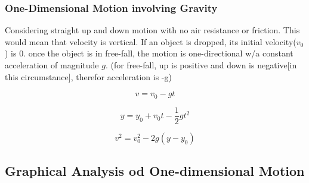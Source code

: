 \documentclass{article}
\begin{document}
\subsubsection{One-Dimensional Motion involving Gravity}
Considering straight up and down motion with no air resistance or friction. This would mean that velocity is vertical. If an object is dropped, its initial velocity($v_0$) is 0. once the object is in free-fall, the motion is one-directional w/a constant acceleration of magnitude $g$. (for free-fall, up is positive and down is negative[in this circumstance], therefor acceleration is -g)

\[ v = v_0 - gt\]

\[y = y_0 + v_0 t - \frac{1}{2}gt^2\]

\[v^2 = v_0^2 - 2g(y - y_0)\]

\subsection{Graphical Analysis od One-dimensional Motion}


  
\end{document}
